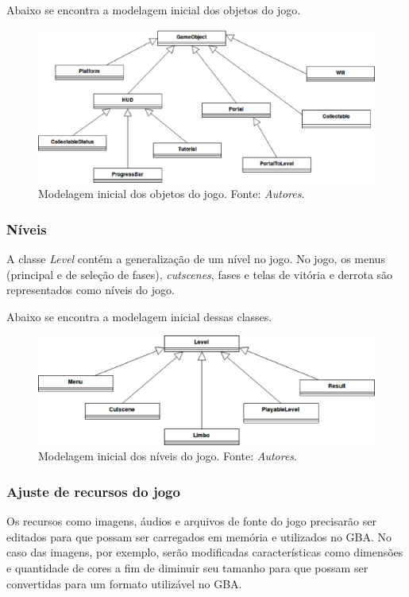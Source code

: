       Abaixo se encontra a modelagem inicial dos objetos do jogo.

      \begin{figure}[H]
        \centering \includegraphics[keepaspectratio=true,scale=0.6]{figuras/class-diagram-1.eps}
        \caption[Modelagem inicial dos objetos do jogo]
          {Modelagem inicial dos objetos do jogo. Fonte: \textit{Autores}.}
        \label{game-object-children}
      \end{figure}

    \subsubsection{Níveis}

      A classe \textit{Level} contém a generalização de um nível no jogo. No jogo, os menus (principal e de seleção de fases), \textit{cutscenes}, fases e telas de vitória e derrota são representados como níveis do jogo.

      Abaixo se encontra a modelagem inicial dessas classes.

      \begin{figure}[H]
        \centering \includegraphics[keepaspectratio=true,scale=0.6]{figuras/class-diagram-2.eps}
        \caption[Modelagem inicial dos níveis do jogo]
          {Modelagem inicial dos níveis do jogo. Fonte: \textit{Autores}.}
        \label{game-object-levels}
      \end{figure}

    \subsubsection{Ajuste de recursos do jogo}

      Os recursos como imagens, áudios e arquivos de fonte do jogo precisarão ser editados para que possam ser carregados em memória e utilizados no GBA. No caso das imagens, por exemplo, serão modificadas características como dimensões e quantidade de cores a fim de diminuir seu tamanho para que possam ser convertidas para um formato utilizável no GBA.